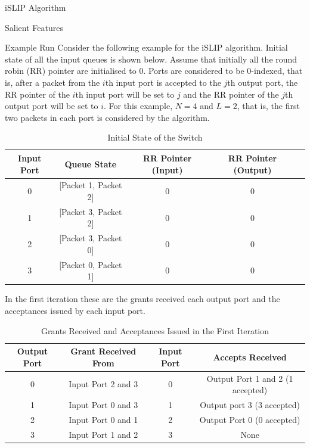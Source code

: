 \begin{section}{iSLIP Algorithm \cite{769767}}
\begin{subsection}{Salient Features}
    \end{subsection}

    \begin{subsection}{Example Run}
        Consider the following example for the iSLIP algorithm. Initial state of all the input queues is shown below. Assume that initially all the round robin (RR) pointer are initialised to 0. Ports are considered to be 0-indexed, that is, after a packet from the $i$th input port is accepted to the $j$th output port, the RR pointer of the $i$th input port will be set to $j$ and the RR pointer of the $j$th output port will be set to $i$. For this example, $N=4$ and $L=2$, that is, the first two packets in each port is considered by the algorithm.\\

        \begin{table}[h!]
            \centering
            \caption{Initial State of the Switch}
            \begin{tabular}{|c|c|c|c|c|}
                \hline
                \textbf{Input Port} & \textbf{Queue State} & \textbf{RR Pointer (Input)} & \textbf{RR Pointer (Output)} \\ \hline
                0 & [Packet 1, Packet 2] & 0 & 0 \\ \hline
                1 & [Packet 3, Packet 2] & 0 & 0 \\ \hline
                2 & [Packet 3, Packet 0] & 0 & 0 \\ \hline
                3 & [Packet 0, Packet 1] & 0 & 0 \\ \hline
            \end{tabular}
            \label{tab:switch_state}
        \end{table}

        In the first iteration these are the grants received each output port and the acceptances issued by each input port. 

        \begin{table}[h!]
            \centering
            \caption{Grants Received and Acceptances Issued in the First Iteration}
            \begin{tabular}{|c|c|c|c|}
                \hline
                \textbf{Output Port} & \textbf{Grant Received From} & \textbf{Input Port} & \textbf{Accepts Received} \\ \hline
                0 & Input Port 2 and 3 & 0 & Output Port 1 and 2 (1 accepted) \\ \hline
                1 & Input Port 0 and 3 & 1 & Output port 3 (3 accepted)\\ \hline
                2 & Input Port 0 and 1 & 2 & Output Port 0 (0 accepted)\\ \hline
                3 & Input Port 1 and 2 & 3 & None \\ \hline
            \end{tabular}
            \label{tab:grants_acceptances}
        \end{table}


\end{subsection}
\end{section}
